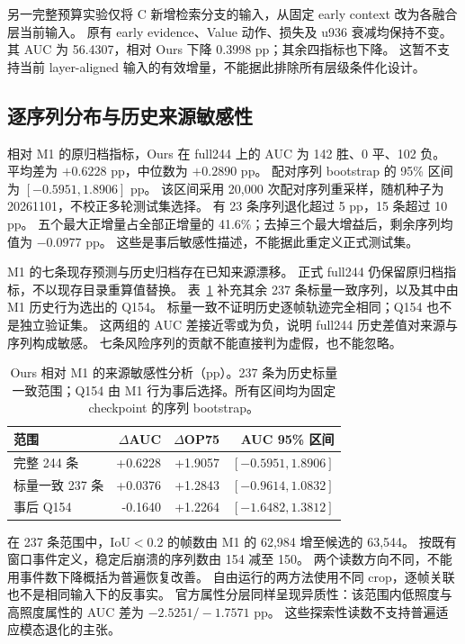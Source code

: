 \documentclass[journal]{IEEEtran}
\begin{document}
另一完整预算实验仅将 C 新增检索分支的输入，从固定 early context 改为各融合层当前输入。
原有 early evidence、Value 动作、损失及 u936 衰减均保持不变。
其 AUC 为 56.4307，相对 Ours 下降 0.3998 pp；其余四指标也下降。
这暂不支持当前 layer-aligned 输入的有效增量，不能据此排除所有层级条件化设计。

\subsection{逐序列分布与历史来源敏感性}
相对 M1 的原归档指标，Ours 在 full244 上的 AUC 为 142 胜、0 平、102 负。
平均差为 $+0.6228$ pp，中位数为 $+0.2890$ pp。
配对序列 bootstrap 的 95\% 区间为 $[-0.5951,1.8906]$ pp。
该区间采用 20,000 次配对序列重采样，随机种子为 20261101，不校正多轮测试集选择。
有 23 条序列退化超过 5 pp，15 条超过 10 pp。
五个最大正增量占全部正增量的 41.6\%；去掉三个最大增益后，剩余序列均值为 $-0.0977$ pp。
这些是事后敏感性描述，不能据此重定义正式测试集。

M1 的七条现存预测与历史归档存在已知来源漂移。
正式 full244 仍保留原归档指标，不以现存目录重算值替换。
表~\ref{tab:sensitivity} 补充其余 237 条标量一致序列，以及其中由 M1 历史行为选出的 Q154。
标量一致不证明历史逐帧轨迹完全相同；Q154 也不是独立验证集。
这两组的 AUC 差接近零或为负，说明 full244 历史差值对来源与序列构成敏感。
七条风险序列的贡献不能直接判为虚假，也不能忽略。

\begin{table}[t]
\centering
\caption{Ours 相对 M1 的来源敏感性分析（pp）。237 条为历史标量一致范围；Q154 由 M1 行为事后选择。所有区间均为固定 checkpoint 的序列 bootstrap。}
\label{tab:sensitivity}
\footnotesize
\setlength{\tabcolsep}{2pt}
\begin{tabular}{@{}lrrr@{}}
\toprule
范围 & $\Delta$AUC & $\Delta$OP75 & AUC 95\% 区间\\
\midrule
完整 244 条 & +0.6228 & +1.9057 & $[-0.5951,1.8906]$\\
标量一致 237 条 & +0.0376 & +1.2843 & $[-0.9614,1.0832]$\\
事后 Q154 & -0.1640 & +1.2264 & $[-1.6482,1.3812]$\\
\bottomrule
\end{tabular}
\end{table}

在 237 条范围中，IoU$<0.2$ 的帧数由 M1 的 62,984 增至候选的 63,544。
按既有窗口事件定义，稳定后崩溃的序列数由 154 减至 150。
两个读数方向不同，不能用事件数下降概括为普遍恢复改善。
自由运行的两方法使用不同 crop，逐帧关联也不是相同输入下的反事实。
官方属性分层同样呈现异质性：该范围内低照度与高照度属性的 AUC 差为 $-2.5251/-1.7571$ pp。
这些探索性读数不支持普遍适应模态退化的主张。
\end{document}
